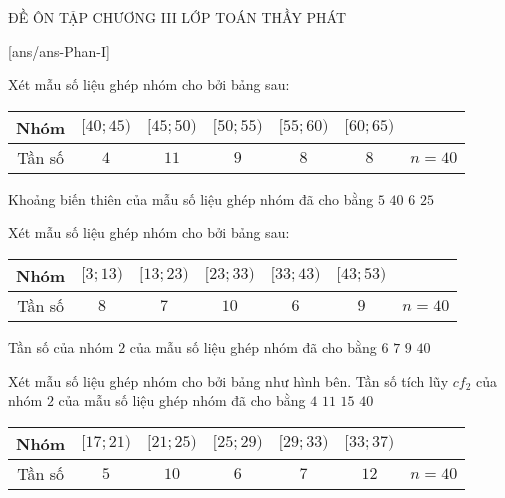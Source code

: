 ﻿\begin{name}
	{\tenchude}
	{ĐỀ ÔN TẬP CHƯƠNG III}
	{LỚP TOÁN THẦY PHÁT}
	{\thoigian}
\end{name}

\TN
{}[ans/ans\currfilebase-Phan-I]

\begin{ex}%
Xét mẫu số liệu ghép nhóm cho bởi bảng sau:
\begin{center}
\begin{tabular}{|c|c|c|c|c|c|c|}
 \hline
 Nhóm & $[40; 45)$ & $[45; 50)$ & $[50; 55)$ & $[55; 60)$ & $[60; 65)$ & \\
 \hline
 Tần số & $4$ & $11$ & $9$ & $8$ & $8$ & $n=40$ \\
 \hline
\end{tabular}
\end{center}
Khoảng biến thiên của mẫu số liệu ghép nhóm đã cho bằng
\choice
{$5$}
{$40$}
{$6$}
{\True $25$}
\end{ex}

\begin{ex}%
 Xét mẫu số liệu ghép nhóm cho bởi bảng sau:
\begin{center}
\begin{tabular}{|c|c|c|c|c|c|c|}
 \hline
 Nhóm & $[3; 13)$ & $[13; 23)$ & $[23; 33)$ & $[33; 43)$ & $[43; 53)$ & \\
 \hline
 Tần số & $8$ & $7$ & $10$ & $6$ & $9$ & $n=40$ \\
 \hline
\end{tabular}
\end{center}
 Tần số của nhóm $2$ của mẫu số liệu ghép nhóm đã cho bằng
 \choice
 {$6$}
 {\True $7$}
 {$9$}
 {$40$}
\end{ex}

\begin{ex}%
Xét mẫu số liệu ghép nhóm cho bởi bảng như hình bên.
 Tần số tích lũy $c f_2$ của nhóm $2$ của mẫu số liệu ghép nhóm đã cho bằng
 \choice
 {$4$}
 {$11$}
 {\True $15$}
 {$40$}
 \begin{center}
 \begin{tabular}{|c|c|c|c|c|c|c|}
 \hline
 Nhóm & $[17; 21)$ & $[21; 25)$ & $[25; 29)$ & $[29; 33)$ & $[33; 37)$ & \\
 \hline
 Tần số & $5$ & $10$ & $6$ & $7$ & $12$ & $n=40$ \\
 \hline
 \end{tabular}
 \end{center}
\end{ex}

